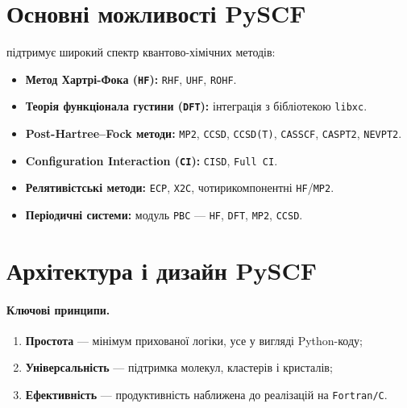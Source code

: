 \section{Основні можливості PySCF}

\PySCF{} підтримує широкий спектр квантово-хімічних методів:

\begin{itemize}
    \item \textbf{Метод Хартрі-Фока (\texttt{HF}):} \texttt{RHF}, \texttt{UHF}, \texttt{ROHF}.
    \item \textbf{Теорія функціонала густини (\texttt{DFT}):} інтеграція з бібліотекою \texttt{libxc}.
    \item \textbf{Post-Hartree–Fock методи:} \texttt{MP2}, \texttt{CCSD}, \texttt{CCSD(T)}, \texttt{CASSCF}, \texttt{CASPT2}, \texttt{NEVPT2}.
    \item \textbf{Configuration Interaction (\texttt{CI}):} \texttt{CISD}, \texttt{Full CI}.
    \item \textbf{Релятивістські методи:} \texttt{ECP}, \texttt{X2C}, чотирикомпонентні \texttt{HF}/\texttt{MP2}.
    \item \textbf{Періодичні системи:} модуль \texttt{PBC} --- \texttt{HF}, \texttt{DFT}, \texttt{MP2}, \texttt{CCSD}.
\end{itemize}

\section{Архітектура і дизайн PySCF}

\paragraph{Ключові принципи.}
\begin{enumerate}
    \item \textbf{Простота} --- мінімум прихованої логіки, усе у вигляді Python-коду;
    \item \textbf{Універсальність} --- підтримка молекул, кластерів і кристалів;
    \item \textbf{Ефективність} --- продуктивність наближена до реалізацій на \texttt{Fortran/C}.
\end{enumerate}


